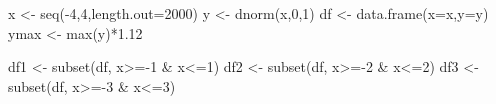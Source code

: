 \documentclass[
  letterpaper,
  DIV=11,
  numbers=noendperiod]{scrreprt}
\newenvironment{Shaded}{\begin{snugshade}}{\end{snugshade}}
\newcommand{\AttributeTok}[1]{\textcolor[rgb]{0.40,0.45,0.13}{#1}}
\newcommand{\DecValTok}[1]{\textcolor[rgb]{0.68,0.00,0.00}{#1}}
\newcommand{\FloatTok}[1]{\textcolor[rgb]{0.68,0.00,0.00}{#1}}
\newcommand{\FunctionTok}[1]{\textcolor[rgb]{0.28,0.35,0.67}{#1}}
\newcommand{\NormalTok}[1]{\textcolor[rgb]{0.00,0.23,0.31}{#1}}
\newcommand{\OtherTok}[1]{\textcolor[rgb]{0.00,0.23,0.31}{#1}}
\newcommand{\SpecialCharTok}[1]{\textcolor[rgb]{0.37,0.37,0.37}{#1}}
\begin{document}
\begin{Shaded}
\begin{Highlighting}[]
\NormalTok{x }\OtherTok{\textless{}{-}} \FunctionTok{seq}\NormalTok{(}\SpecialCharTok{{-}}\DecValTok{4}\NormalTok{,}\DecValTok{4}\NormalTok{,}\AttributeTok{length.out=}\DecValTok{2000}\NormalTok{)}
\NormalTok{y }\OtherTok{\textless{}{-}} \FunctionTok{dnorm}\NormalTok{(x,}\DecValTok{0}\NormalTok{,}\DecValTok{1}\NormalTok{)}
\NormalTok{df }\OtherTok{\textless{}{-}} \FunctionTok{data.frame}\NormalTok{(}\AttributeTok{x=}\NormalTok{x,}\AttributeTok{y=}\NormalTok{y)}
\NormalTok{ymax }\OtherTok{\textless{}{-}} \FunctionTok{max}\NormalTok{(y)}\SpecialCharTok{*}\FloatTok{1.12}

\NormalTok{df1 }\OtherTok{\textless{}{-}} \FunctionTok{subset}\NormalTok{(df, x}\SpecialCharTok{\textgreater{}={-}}\DecValTok{1} \SpecialCharTok{\&}\NormalTok{ x}\SpecialCharTok{\textless{}=}\DecValTok{1}\NormalTok{)}
\NormalTok{df2 }\OtherTok{\textless{}{-}} \FunctionTok{subset}\NormalTok{(df, x}\SpecialCharTok{\textgreater{}={-}}\DecValTok{2} \SpecialCharTok{\&}\NormalTok{ x}\SpecialCharTok{\textless{}=}\DecValTok{2}\NormalTok{)}
\NormalTok{df3 }\OtherTok{\textless{}{-}} \FunctionTok{subset}\NormalTok{(df, x}\SpecialCharTok{\textgreater{}={-}}\DecValTok{3} \SpecialCharTok{\&}\NormalTok{ x}\SpecialCharTok{\textless{}=}\DecValTok{3}\NormalTok{)}


\end{Highlighting}
\end{Shaded}
\end{document}
